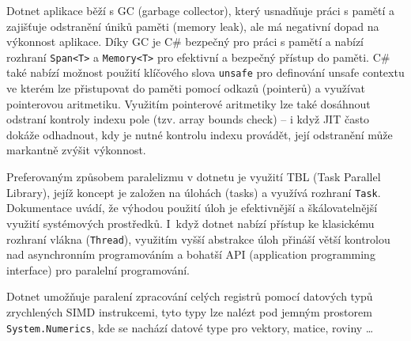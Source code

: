 Dotnet aplikace běží s GC (garbage collector), který usnadňuje práci s pamětí a zajišťuje odstranění úniků paměti (memory leak), ale má negativní dopad na výkonnost aplikace. Díky GC je C\# bezpečný pro práci s pamětí a nabízí rozhraní \texttt{Span<T>} a \texttt{Memory<T>} pro efektivní a bezpečný přístup do paměti. C\# také nabízí možnost použití klíčového slova \texttt{unsafe} pro definování unsafe contextu ve kterém lze přistupovat do paměti  pomocí odkazů (pointerů) a využívat pointerovou aritmetiku. Využitím pointerové aritmetiky lze také dosáhnout odstraní kontroly indexu pole (tzv. array bounds check) -- i když JIT často dokáže odhadnout, kdy je nutné kontrolu indexu provádět, její odstranění může markantně zvýšit výkonnost. 

Preferovaným způsobem paralelizmu v dotnetu je využití TBL (Task Parallel Library), jejíž koncept je založen na úlohách (tasks) a využívá rozhraní \texttt{Task}. Dokumentace \cite{dotnet_doc:tbl} uvádí, že výhodou použití úloh je efektivnější a škálovatelnější využití systémových prostředků. I~když dotnet nabízí přístup ke klasickému rozhraní vlákna (\texttt{Thread}), využitím vyšší abstrakce úloh přináší větší kontrolou nad asynchronním programováním a bohatší API (application programming interface) pro paralelní programování. 

Dotnet umožňuje paralení zpracování celých registrů pomocí datových typů zrychlených SIMD instrukcemi, tyto typy lze nalézt pod jemným prostorem \texttt{System.Numerics}, kde se nachází datové type pro vektory, matice, roviny \dots

